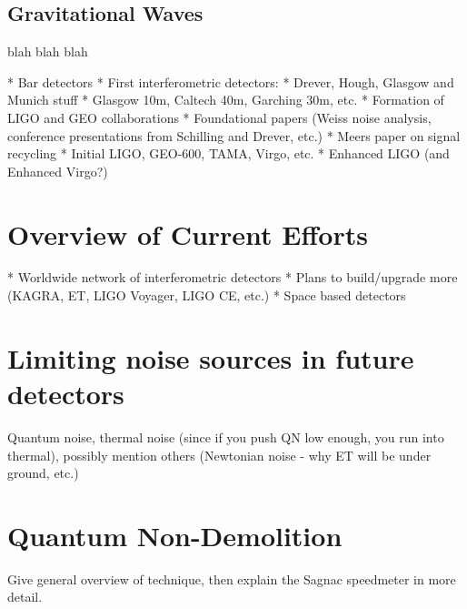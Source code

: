 \subsection{Gravitational Waves}
blah blah blah

* Bar detectors
* First interferometric detectors:
  * Drever, Hough, Glasgow and Munich stuff
  * Glasgow 10m, Caltech 40m, Garching 30m, etc.
  * Formation of LIGO and GEO collaborations
  * Foundational papers (Weiss noise analysis, conference presentations from Schilling and Drever, etc.)
  * Meers paper on signal recycling
  * Initial LIGO, GEO-600, TAMA, Virgo, etc.
  * Enhanced LIGO (and Enhanced Virgo?)

\section{Overview of Current Efforts}
* Worldwide network of interferometric detectors
* Plans to build/upgrade more (KAGRA, ET, LIGO Voyager, LIGO CE, etc.)
* Space based detectors

\section{Limiting noise sources in future detectors}
Quantum noise, thermal noise (since if you push QN low enough, you run into thermal), possibly mention others (Newtonian noise - why ET will be under ground, etc.)

\section{Quantum Non-Demolition}
Give general overview of technique, then explain the Sagnac speedmeter in more detail.